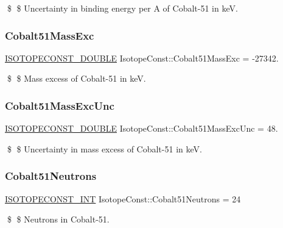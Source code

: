 \$ \$ Uncertainty in binding energy per A of Cobalt-\/51 in keV. \mbox{\label{group___isotope_const-_cobalt-_co51_ga4611c66144abb1f8ac4f4429cf8bd1b1}} 
\subsubsection{\texorpdfstring{Cobalt51\+Mass\+Exc}{Cobalt51MassExc}}
{\footnotesize\ttfamily \mbox{\hyperlink{group___isotope_const-_macros_ga8f45a7272ce02c0b4c65c44636ed719a}{I\+S\+O\+T\+O\+P\+E\+C\+O\+N\+S\+T\+\_\+\+D\+O\+U\+B\+LE}} Isotope\+Const\+::\+Cobalt51\+Mass\+Exc = -\/27342.}

\$ \$ Mass excess of Cobalt-\/51 in keV. \mbox{\label{group___isotope_const-_cobalt-_co51_gaa3b098bb70f3f9c3f351fac99951effa}} 
\subsubsection{\texorpdfstring{Cobalt51\+Mass\+Exc\+Unc}{Cobalt51MassExcUnc}}
{\footnotesize\ttfamily \mbox{\hyperlink{group___isotope_const-_macros_ga8f45a7272ce02c0b4c65c44636ed719a}{I\+S\+O\+T\+O\+P\+E\+C\+O\+N\+S\+T\+\_\+\+D\+O\+U\+B\+LE}} Isotope\+Const\+::\+Cobalt51\+Mass\+Exc\+Unc = 48.}

\$ \$ Uncertainty in mass excess of Cobalt-\/51 in keV. \mbox{\label{group___isotope_const-_cobalt-_co51_gab2d92ea0df3807d44b3402f0fc73117f}} 
\subsubsection{\texorpdfstring{Cobalt51\+Neutrons}{Cobalt51Neutrons}}
{\footnotesize\ttfamily \mbox{\hyperlink{group___isotope_const-_macros_ga5f18360b3e99483a35c32d789e62621c}{I\+S\+O\+T\+O\+P\+E\+C\+O\+N\+S\+T\+\_\+\+I\+NT}} Isotope\+Const\+::\+Cobalt51\+Neutrons = 24}

\$ \$ Neutrons in Cobalt-\/51. \mbox{\label{group___isotope_const-_cobalt-_co51_ga05d19077598f5b33bf7f4429f1da0921}} 
